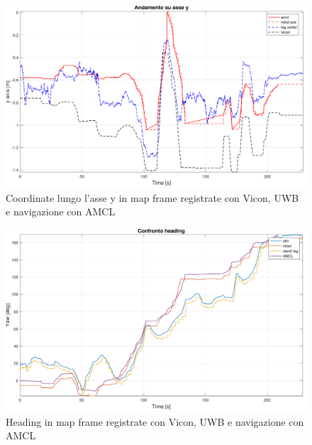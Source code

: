 \begin{figure}[h] 
	\centering    
	\includegraphics[height=.3\textheight]{grafici_stanzavolo_vicon/figure6.pdf}
	\caption{Coordinate lungo l'asse y in map frame registrate con Vicon, UWB e navigazione con AMCL}
	\label{fig: asse_y_vicon_charlie}
\end{figure}

\begin{figure}[] 
	\centering    
	\includegraphics[height=.3\textheight]{grafici_stanzavolo_vicon/figure2.pdf}
	\caption{Heading in map frame registrate con Vicon, UWB e navigazione con AMCL}
	\label{fig: heading_vicon_charlie}
\end{figure}

